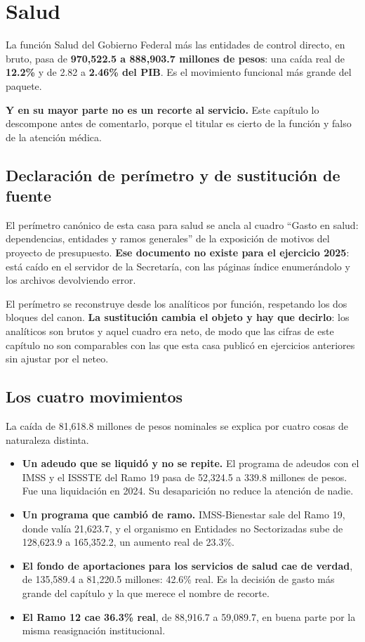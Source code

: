 \chapter{Salud}

La función Salud del Gobierno Federal más las entidades de control directo, en
bruto, pasa de \textbf{970,522.5 a 888,903.7 millones de pesos}: una caída real de
\textbf{12.2\%} y de 2.82 a \textbf{2.46\% del PIB}. Es el movimiento funcional
más grande del paquete.

\textbf{Y en su mayor parte no es un recorte al servicio.} Este capítulo lo
descompone antes de comentarlo, porque el titular es cierto de la función y falso
de la atención médica.

\section{Declaración de perímetro y de sustitución de fuente}

El perímetro canónico de esta casa para salud se ancla al cuadro ``Gasto en salud:
dependencias, entidades y ramos generales'' de la exposición de motivos del
proyecto de presupuesto. \textbf{Ese documento no existe para el ejercicio 2025}:
está caído en el servidor de la Secretaría, con las páginas índice enumerándolo y
los archivos devolviendo error.

El perímetro se reconstruye desde los analíticos por función, respetando los dos
bloques del canon. \textbf{La sustitución cambia el objeto y hay que decirlo}: los
analíticos son brutos y aquel cuadro era neto, de modo que las cifras de este
capítulo no son comparables con las que esta casa publicó en ejercicios anteriores
sin ajustar por el neteo.



\section{Los cuatro movimientos}

La caída de 81,618.8 millones de pesos nominales se explica por cuatro cosas de
naturaleza distinta.

\begin{itemize}
\item \textbf{Un adeudo que se liquidó y no se repite.} El programa de adeudos
con el IMSS y el ISSSTE del Ramo 19 pasa de 52,324.5 a 339.8 millones de pesos.
Fue una liquidación en 2024. Su desaparición no reduce la atención de nadie.
\item \textbf{Un programa que cambió de ramo.} IMSS-Bienestar sale del Ramo 19,
donde valía 21,623.7, y el organismo en Entidades no Sectorizadas sube de
128,623.9 a 165,352.2, un aumento real de 23.3\%.
\item \textbf{El fondo de aportaciones para los servicios de salud cae de verdad},
de 135,589.4 a 81,220.5 millones: 42.6\% real. Es la decisión de gasto más grande
del capítulo y la que merece el nombre de recorte.
\item \textbf{El Ramo 12 cae 36.3\% real}, de 88,916.7 a 59,089.7, en buena parte
por la misma reasignación institucional.
\end{itemize}

